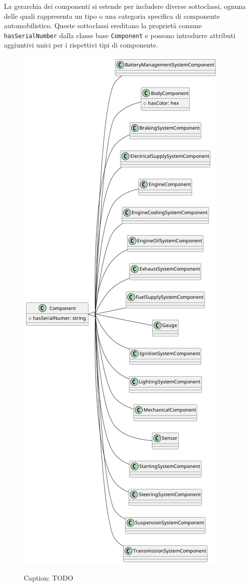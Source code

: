 La gerarchia dei componenti si estende per includere diverse sottoclassi, ognuna delle quali rappresenta un tipo o una categoria specifica di componente automobilistico. Queste sottoclassi ereditano la proprietà comune \texttt{hasSerialNumber} dalla classe base \texttt{Component} e possono introdurre attributi aggiuntivi unici per i rispettivi tipi di componente.

\begin{figure}[H]
    \caption{Caption: TODO}
    \includegraphics[height=\textheight]{figures/carpedia-component.png}
    \label{fig:carpedia-component}
\end{figure}

